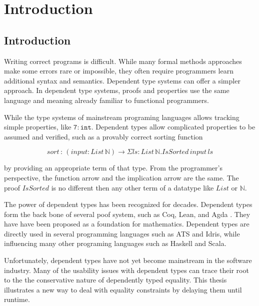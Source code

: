 \chapter{Introduction}
\label{chapter:Introduction}
\thispagestyle{myheadings}

\section{Introduction} %

Writing correct programs is difficult. While many formal methods approaches
make some errors rare or impossible, they often require programmers
learn additional syntax and semantics. Dependent type systems can
offer a simpler approach. In dependent type systems, proofs and properties
use the same language and meaning already familiar to functional programmers.

While the type systems of mainstream programing languages allows tracking
simple properties, like $\mathtt{7:int}$. Dependent types allow complicated
properties to be assumed and verified, such as a provably correct
sorting function 

\[
sort\,:\,\left(input:List\,\mathbb{N}\right)\rightarrow\Sigma ls:List\,\mathbb{N}.IsSorted\,input\,ls
\]

by providing an appropriate term of that type. From the programmer's
perspective, the function arrow and the implication arrow are the
same. The proof $IsSorted$ is no different then any other term of
a datatype like $List$ or $\mathbb{N}$. 

The power of dependent types has been recognized for decades. Dependent
types form the back bone of several poof system, such as Coq\cite{Coq12},
Lean\cite{10.1007/978-3-030-79876-5_37}, and Agda\cite{norell2007towards}
. They have have been proposed as a foundation for mathematics\cite{Martin-Lof-1972,HoTTbook}.
Dependent types are directly used in several programming languages
such as ATS\cite{DependentMLAnapproachtopracticalprogrammingwithdependenttypes}
and Idris\cite{brady2013idris}, while influencing many other programing
languages such as Haskell and Scala. 

Unfortunately, dependent types have not yet become mainstream in the
software industry. Many of the usability issues with dependent types
can trace their root to the the conservative nature of dependently
typed equality. This thesis illustrates a new way to deal with equality
constraints by delaying them until runtime.

